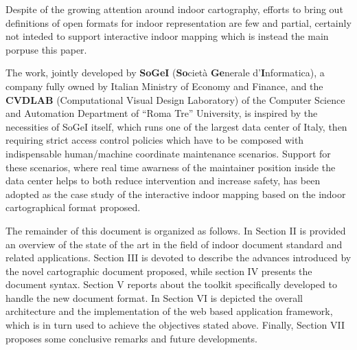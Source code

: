 Despite of the growing attention around indoor cartography, efforts to bring out definitions of open formats for indoor representation are few and partial, certainly not inteded to support interactive indoor mapping which is instead the main porpuse this paper. 

The work, jointly developed by {\bf SoGeI} ({\bf So}ciet\`a {\bf Ge}nerale d'{\bf I}nformatica), a company fully owned by Italian  Ministry of Economy and Finance, and the {\bf CVDLAB} (Computational Visual Design Laboratory) of the Computer Science and Automation Department of ``Roma Tre'' University, is inspired by the necessities of SoGeI itself, which runs one of the largest data center of Italy, then requiring strict access control policies which have to be composed with indispensable human/machine coordinate maintenance scenarios. Support for these scenarios, where real time awarness of the maintainer position inside the data center helps to both reduce intervention and increase safety, has been adopted as the case study of the interactive indoor mapping based on the indoor cartographical format proposed.


The remainder of this document is organized as follows. In Section II is
provided an overview of the state of the art in the field of indoor document
standard and related applications. Section III is devoted to describe the
advances introduced by the novel cartographic document proposed, while section
IV presents the document syntax. Section V reports about the toolkit
specifically developed to handle the new document format. In Section VI is
depicted the overall architecture and the implementation of the web based
application framework, which is in turn used to achieve the objectives stated above.
Finally, Section VII proposes some conclusive remarks and future developments.





